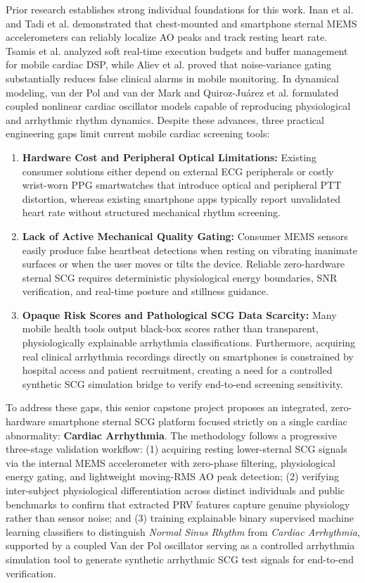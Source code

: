 Prior research establishes strong individual foundations for this work. Inan et al. \cite{inan2015ballistocardiography} and Tadi et al. \cite{tadi2016realtime} demonstrated that chest-mounted and smartphone sternal MEMS accelerometers can reliably localize AO peaks and track resting heart rate. Tsamis et al. \cite{tsamis2017soft} analyzed soft real-time execution budgets and buffer management for mobile cardiac DSP, while Aliev et al. \cite{aliev2012monitoring} proved that noise-variance gating substantially reduces false clinical alarms in mobile monitoring. In dynamical modeling, van der Pol and van der Mark \cite{vanderpol1928} and Quiroz-Ju{\'a}rez et al. \cite{quiroz2018cardiac} formulated coupled nonlinear cardiac oscillator models capable of reproducing physiological and arrhythmic rhythm dynamics. Despite these advances, three practical engineering gaps limit current mobile cardiac screening tools:
\begin{enumerate}
	\item \textbf{Hardware Cost and Peripheral Optical Limitations:} Existing consumer solutions either depend on external ECG peripherals or costly wrist-worn PPG smartwatches that introduce optical and peripheral PTT distortion, whereas existing smartphone apps typically report unvalidated heart rate without structured mechanical rhythm screening.
	\item \textbf{Lack of Active Mechanical Quality Gating:} Consumer MEMS sensors easily produce false heartbeat detections when resting on vibrating inanimate surfaces or when the user moves or tilts the device. Reliable zero-hardware sternal SCG requires deterministic physiological energy boundaries, SNR verification, and real-time posture and stillness guidance.
	\item \textbf{Opaque Risk Scores and Pathological SCG Data Scarcity:} Many mobile health tools output black-box scores rather than transparent, physiologically explainable arrhythmia classifications. Furthermore, acquiring real clinical arrhythmia recordings directly on smartphones is constrained by hospital access and patient recruitment, creating a need for a controlled synthetic SCG simulation bridge to verify end-to-end screening sensitivity.
\end{enumerate}

To address these gaps, this senior capstone project proposes an integrated, zero-hardware smartphone sternal SCG platform focused strictly on a single cardiac abnormality: \textbf{Cardiac Arrhythmia}. The methodology follows a progressive three-stage validation workflow: (1) acquiring resting lower-sternal SCG signals via the internal MEMS accelerometer with zero-phase filtering, physiological energy gating, and lightweight moving-RMS AO peak detection; (2) verifying inter-subject physiological differentiation across distinct individuals and public benchmarks to confirm that extracted PRV features capture genuine physiology rather than sensor noise; and (3) training explainable binary supervised machine learning classifiers to distinguish \textit{Normal Sinus Rhythm} from \textit{Cardiac Arrhythmia}, supported by a coupled Van der Pol oscillator serving as a controlled arrhythmia simulation tool to generate synthetic arrhythmic SCG test signals for end-to-end verification.

